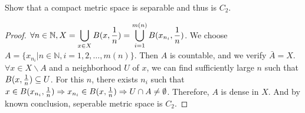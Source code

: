 \begin{problem}
Show that a compact metric space is separable and thus is $C_2$.
\end{problem}
\begin{solution}
\begin{proof}
$\forall n\in \mathbb{N},X = \displaystyle\bigcup_{x\in X} B(x,{1\over n}) = \displaystyle\bigcup_{i=1}^{m(n)} B(x_{n_i},{1 \over n})$. We choose $A=\{x_{n_i}| n\in \mathbb{N},i=1,2,\dots,m(n)\}$. Then $A$ is countable, and we verify $\bar{A}=X$. $\forall x\in X\backslash A$ and a neighborhood $U$ of $x$, we can find sufficiently large $n$ such that $B(x,{1\over n})\subseteq U$. For this $n$, there exists $n_i$ such that 
$x \in B(x_{n_i},{1\over n})\Rightarrow x_{n_i}\in B(x,{1\over n})\Rightarrow U\cap A\neq \emptyset$. Therefore, $A$ is dense in $X$. And by known conclusion, seperable metric space is $C_2$.
\end{proof}
\end{solution}


